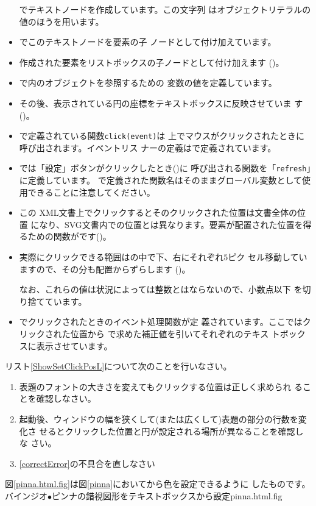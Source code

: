 \begin{itemize}
       でテキストノードを作成しています。この文字列
       はオブジェクトリテラルの値のほうを用います。
 \item {}でこのテキストノードを要素の子
       ノードとして付け加えています。
 \item 作成された要素をリストボックスの子ノードとして付け加えます
       ()。
 \item {}で\HTML 内のオブジェクトを参照するための
       変数の値を定義しています。
 \item その後、表示されている円の座標をテキストボックスに反映させていま
       す()。
  \item {}で定義されている関数\texttt{click(event)}は
       \SVG 上でマウスがクリックされたときに呼び出されます。イベントリス
       ナーの定義はで定義されています。
 \item {}では「設定」ボタンがクリックしたとき()に
       呼び出される関数を「\texttt{refresh}」に定義しています。
       で定義された関数名はそのままグローバル変数として使
       用できることに注意してください。
 \item この XML文書上でクリックするとそのクリックされた位置は文書全体の位置
       になり、SVG文書内での位置とは異なります。要素が配置された位置を得
       るための関数がです()。
 \item 実際にクリックできる範囲はの中で下、右にそれぞれ$5$ピク
			 セル移動していますので、その分も配置からずらします
			 ()。

			 なお、これらの値は状況によっては整数とはならないので、小数点以下
			 を切り捨てています。
 \item {}でクリックされたときのイベント処理関数が定
       義されています。ここではクリックされた位置から
       で求めた補正値を引いてそれぞれのテキス
       トボックスに表示させています。
\end{itemize}
\begin{Problem}\upshape
 リスト\ref{ShowSetClickPosL}について次のことを行いなさい。
\begin{enumerate}
 \item 表題のフォントの大きさを変えてもクリックする位置は正しく求められ
       ることを確認しなさい。
 \item 起動後、ウィンドウの幅を狭くして(または広くして)表題の部分の行数を変化さ
       せるとクリックした位置と円が設定される場所が異なることを確認しな
       さい。\label{correctError}
 \item \ref{correctError}の不具合を直しなさい
\end{enumerate}
\end{Problem}
図\ref{pinna.html.fig}は図\ref{pinna}において\HTML から色を設定できるように
したものです。
{バインジオ$\bullet$ピンナの錯視図形をテキストボックスから設定}{pinna.html.fig}

